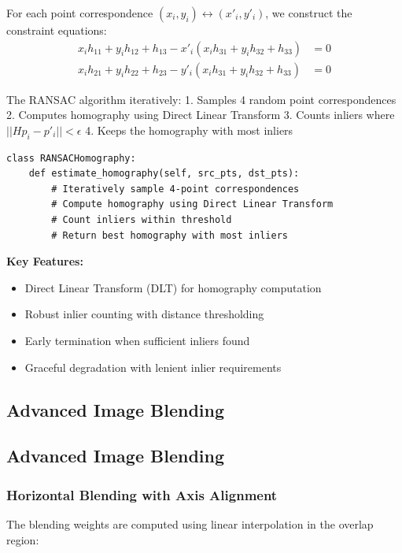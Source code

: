 \documentclass[12pt,a4paper]{article}
\begin{document}
For each point correspondence $(x_i, y_i) \leftrightarrow (x'_i, y'_i)$, we construct the constraint equations:
\begin{align}
x_i h_{11} + y_i h_{12} + h_{13} - x'_i (x_i h_{31} + y_i h_{32} + h_{33}) &= 0 \\
x_i h_{21} + y_i h_{22} + h_{23} - y'_i (x_i h_{31} + y_i h_{32} + h_{33}) &= 0
\end{align}

The RANSAC algorithm iteratively:
1. Samples 4 random point correspondences
2. Computes homography using Direct Linear Transform
3. Counts inliers where $||Hp_i - p'_i|| < \epsilon$
4. Keeps the homography with most inliers

\begin{lstlisting}[caption=RANSAC Homography Implementation]
class RANSACHomography:
    def estimate_homography(self, src_pts, dst_pts):
        # Iteratively sample 4-point correspondences
        # Compute homography using Direct Linear Transform
        # Count inliers within threshold
        # Return best homography with most inliers
\end{lstlisting}

\textbf{Key Features:}
\begin{itemize}
    \item Direct Linear Transform (DLT) for homography computation
    \item Robust inlier counting with distance thresholding
    \item Early termination when sufficient inliers found
    \item Graceful degradation with lenient inlier requirements
\end{itemize}

\subsection{Advanced Image Blending}

\subsection{Advanced Image Blending}

\subsubsection{Horizontal Blending with Axis Alignment}
The blending weights are computed using linear interpolation in the overlap region:
\end{document}
